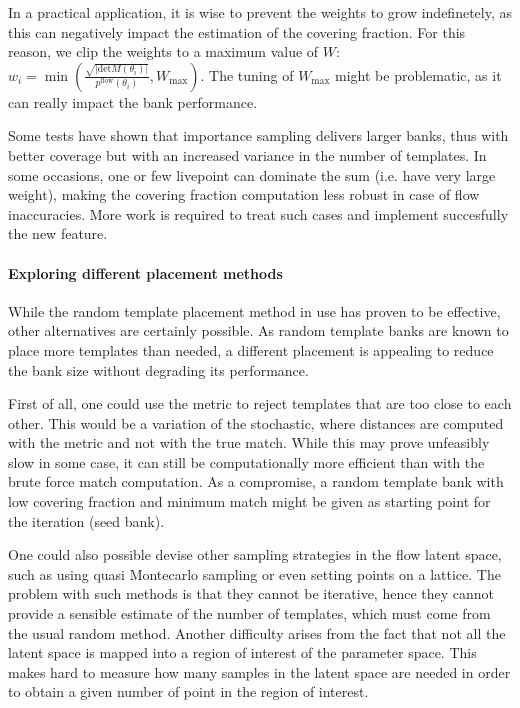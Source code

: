 \documentclass[twocolumn,showpacs,preprintnumbers,nofootinbib,prd,
superscriptaddress,10pt]{revtex4-2}
\begin{document}
In a practical application, it is wise to prevent the weights to grow indefinetely, as this can negatively impact the estimation of the covering fraction. For this reason, we clip the weights to a maximum value of $W$: ${w_i = \min\left(\frac{\sqrt{|\text{det}M(\theta_i)|}}{p^\text{flow}(\theta_i)}, W_\text{max} \right)}$. The tuning of $W_\text{max}$ might be problematic, as it can really impact the bank performance.

Some tests have shown that importance sampling delivers larger banks, thus with better coverage but with an increased variance in the number of templates. In some occasions, one or few livepoint can dominate the sum (i.e. have very large weight), making the covering fraction computation less robust in case of flow inaccuracies.
More work is required to treat such cases and implement succesfully the new feature.

\paragraph{Exploring different placement methods}

While the random template placement method in use has proven to be effective, other alternatives are certainly possible. As random template banks are known to place more templates than needed, a different placement is appealing to reduce the bank size without degrading its performance.

First of all, one could use the metric to reject templates that are too close to each other. This would be a variation of the stochastic, where distances are computed with the metric and not with the true match. While this may prove unfeasibly slow in some case, it can still be computationally more efficient than with the brute force match computation. As a compromise, a random template bank with low covering fraction and minimum match might be given as starting point for the iteration (seed bank).

One could also possible devise other sampling strategies in the flow latent space, such as using quasi Montecarlo sampling or even setting points on a lattice.
The problem with such methods is that they cannot be iterative, hence they cannot provide a sensible estimate of the number of templates, which must come from the usual random method. Another difficulty arises from the fact that not all the latent space is mapped into a region of interest of the parameter space. This makes hard to measure how many samples in the latent space are needed in order to obtain a given number of point in the region of interest.
\end{document}
